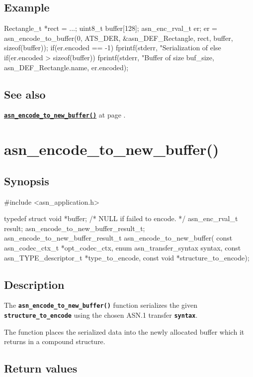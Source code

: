 \documentclass[english,oneside,12pt]{book}
\newcommand{\apisection}[2]{\clearpage\section{\label{#1}#2}}
\newcommand{\api}[2]{\hyperref[#1]{\code{#2}}}
\newcommand{\seealso}[2]{\api{#1}{#2} at page \pageref{#1}}
\newcommand{\code}[1]{\texttt{\textbf{\lstinline{#1}}}}
\begin{document}
\subsection*{Example}
\begin{example}
Rectangle_t *rect = ...;
uint8_t buffer[128];
asn_enc_rval_t er;
er = asn_encode_to_buffer(0, ATS_DER, &asn_DEF_Rectangle, rect, buffer, sizeof(buffer));
if(er.encoded == -1) {
   fprintf(stderr, "Serialization of %
} else if(er.encoded > sizeof(buffer)) {
   fprintf(stderr, "Buffer of size %
       buf_size, asn_DEF_Rectangle.name, er.encoded);
}
\end{example}

\subsection*{See also}
\seealso{sec:asn_encode_to_new_buffer}{asn_encode_to_new_buffer()}.

\apisection{sec:asn_encode_to_new_buffer}{asn\_encode\_to\_new\_buffer()}

\subsection*{Synopsis}

\begin{signature}
#include <asn_application.h>

typedef struct {
    void *buffer;   /* NULL if failed to encode. */
    asn_enc_rval_t result;
} asn_encode_to_new_buffer_result_t;
asn_encode_to_new_buffer_result_t asn_encode_to_new_buffer(
    const asn_codec_ctx_t *opt_codec_ctx,
    enum asn_transfer_syntax syntax,
    const asn_TYPE_descriptor_t *type_to_encode,
    const void *structure_to_encode);
\end{signature}

\subsection*{Description}

The \code{asn_encode_to_new_buffer()} function serializes the given \code{structure_to_encode} using the chosen ASN.1 transfer \code{syntax}.

The function places the serialized data into the newly allocated buffer
which it returns in a compound structure.

\subsection*{Return values}
\end{document}
